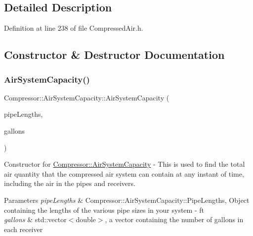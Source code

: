 \subsection{Detailed Description}


Definition at line 238 of file Compressed\+Air.\+h.



\subsection{Constructor \& Destructor Documentation}
\mbox{\label{class_compressor_1_1_air_system_capacity_a270fa85146172b46703970a1bc8fe724}} 
\subsubsection{\texorpdfstring{Air\+System\+Capacity()}{AirSystemCapacity()}\hspace{0.1cm}{\footnotesize\ttfamily [1/3]}}
{\footnotesize\ttfamily Compressor\+::\+Air\+System\+Capacity\+::\+Air\+System\+Capacity (\begin{DoxyParamCaption}\item[{\hyperlink{struct_compressor_1_1_pipe_data}{Compressor\+::\+Pipe\+Data}}]{pipe\+Lengths,  }\item[{std\+::vector$<$ double $>$}]{gallons }\end{DoxyParamCaption})}

Constructor for \hyperlink{class_compressor_1_1_air_system_capacity}{Compressor\+::\+Air\+System\+Capacity} -\/ This is used to find the total air quantity that the compressed air system can contain at any instant of time, including the air in the pipes and receivers. 
\begin{DoxyParams}{Parameters}
{\em pipe\+Lengths} & Compressor\+::\+Air\+System\+Capacity\+::\+Pipe\+Lengths, Object containing the lengths of the various pipe sizes in your system -\/ ft \\
\hline
{\em gallons} & std\+::vector$<$double$>$, a vector containing the number of gallons in each receiver \\
\hline
\end{DoxyParams}


